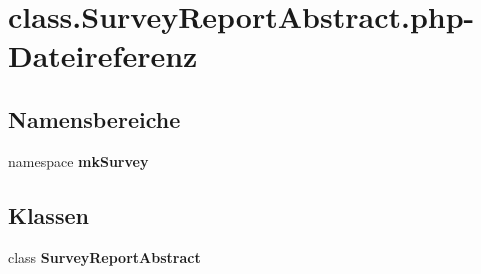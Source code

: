 \section{class.SurveyReportAbstract.php-Dateireferenz}
\label{class_8SurveyReportAbstract_8php}
\subsection*{Namensbereiche}
\begin{CompactItemize}
\item 
namespace {\bf mkSurvey}
\end{CompactItemize}
\subsection*{Klassen}
\begin{CompactItemize}
\item 
class {\bf SurveyReportAbstract}
\end{CompactItemize}
